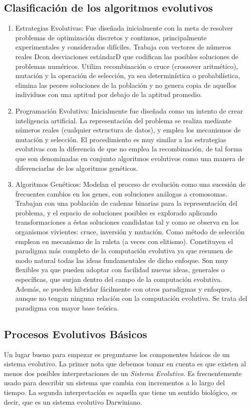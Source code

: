 \documentclass{article}
\begin{document}
\subsection{Clasificación de los algoritmos evolutivos}
\begin{enumerate}
    \item Estrategias Evolutivas:
Fue diseñada inicialmente
con la meta de resolver problemas de optimización discretos y continuos,
principalmente experimentales y considerados difíciles. Trabaja con vectores de
números reales Dcon desviaciones estándarD que codifican las posibles soluciones de
problemas numéricos. Utiliza recombinación o cruce (crossover aritmético), mutación y
la operación de selección, ya sea determinística o probabilística, elimina las peores
soluciones de la población y no genera copia de aquellos individuos con una aptitud por
debajo de la aptitud promedio.
  \item{Programación Evolutiva:}
  Inicialmente fue diseñada como un intento de crear inteligencia artificial.
La representación del problema se realiza mediante números reales (cualquier estructura
de datos), y emplea los mecanismos de mutación y selección. El procedimiento es muy
similar a las estrategias evolutivas con la diferencia de que no emplea la recombinación,
de tal forma que son denominadas en conjunto algoritmos evolutivos como una manera
de diferenciarlas de los algoritmos genéticos. 
\item{Algoritmos Genéticos:}
Modelan el proceso de evolución como una sucesión de
frecuentes cambios en los genes, con soluciones análogas a cromosomas. Trabajan con
una población de cadenas binarias para la 
 representación del problema, y el espacio de
soluciones posibles es explorado aplicando transformaciones a éstas soluciones
candidatas tal y como se observa en los organismos vivientes: cruce, inversión y
mutación. Como método de selección emplean en mecanismo de la ruleta (a veces con
elitismo). Constituyen el paradigma más completo de la computación evolutiva ya que 
resumen de modo natural todas las ideas fundamentales de dicho enfoque. Son muy
flexibles ya que pueden adoptar con facilidad nuevas ideas, generales o específicas, que
surjan dentro del campo de la computación evolutiva. Además, se pueden hibridar
fácilmente con otros paradigmas y enfoques, aunque no tengan ninguna relación con la
computación evolutiva. Se trata del paradigma con mayor base teórica.\cite{Coley (1999)}
\end{enumerate}
\subsection{Procesos Evolutivos B\'asicos}
Un lugar bueno para empezar es preguntarse los componentes b\'asicos de un sistema evolutivo. La primer nota que debemos tomar en cuenta es que existen al menos dos posibles interpretaciones de un \textit{Sistema Evolutivo}. Es frecuentemente usado para describir un sistema que cambia con incrementos a lo largo del tiempo. La segunda interpretaci\'on es aquella que tiene un sentido biol\'ogico, es decir, que es un sistema evolutivo Darwiniano.\cite{Goldberg(1989)}
\end{document}
